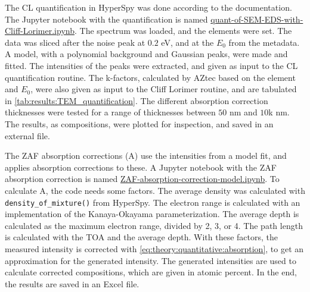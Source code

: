 The CL quantification in HyperSpy was done according to the documentation.
The Jupyter notebook with the quantification is named \href{https://github.com/brynjarmorka/eds-sem-bulk-corrections/blob/main/quant-of-SEM-EDS-with-Cliff-Lorimer.ipynb}{quant-of-SEM-EDS-with-Cliff-Lorimer.ipynb}.
The spectrum was loaded, and the elements were set.
The data was sliced after the noise peak at $0.2$ eV, and at the $E_0$ from the metadata.
A model, with a polynomial background and Gaussian peaks, were made and fitted.
The intensities of the peaks were extracted, and given as input to the CL quantification routine.
The k-factors, calculated by AZtec based on the element and $E_0$, were also given as input to the Cliff Lorimer routine, and are tabulated in \cref{tab:results:TEM_quantification}.
The different absorption correction thicknesses were tested for a range of thicknesses between $50$ nm and $10$k nm.
The results, as compositions, were plotted for inspection, and saved in an external file.

The ZAF absorption corrections (A) use the intensities from a model fit, and applies absorption corrections to these.
A Jupyter notebook with the ZAF absorption correction is named \href{https://github.com/brynjarmorka/eds-sem-bulk-corrections/blob/main/ZAF-absorption-correction-model.ipynb}{ZAF-absorption-correction-model.ipynb}.
To calculate A, the code needs some factors. 
The average density was calculated with \verb|density_of_mixture()| from HyperSpy.
The electron range is calculated with an implementation of the Kanaya-Okayama parameterization.
The average depth is calculated as the maximum electron range, divided by 2, 3, or 4.
The path length is calculated with the TOA and the average depth.
With these factors, the measured intensity is corrected with \cref{eq:theory:quantitative:absorption}, to get an approximation for the generated intensity. 
The generated intensities are used to calculate corrected compositions, which are given in atomic percent.
In the end, the results are saved in an Excel file.


